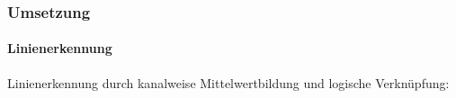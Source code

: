 \documentclass[xcolor=dvipsnames]{beamer}
\begin{document}
\begin{frame}
	\frametitle{Umsetzung}
	\framesubtitle{Linienerkennung}

	Linienerkennung durch kanalweise Mittelwertbildung und logische Verknüpfung:\vfill
	\begin{columns}
	\end{columns}

\end{frame}
\end{document}
